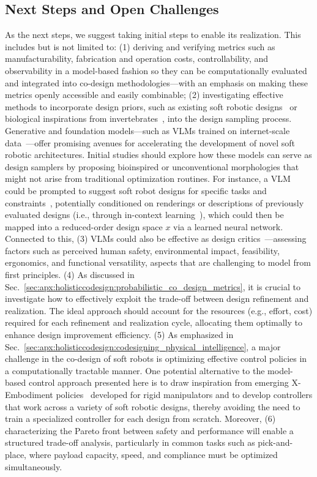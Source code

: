 \subsection{Next Steps and Open Challenges}
As the next steps, we suggest taking initial steps to enable its realization. This includes but is not limited to: (1) deriving and verifying metrics such as manufacturability, fabrication and operation costs, controllability, and observability in a model-based fashion so they can be computationally evaluated and integrated into co-design methodologies—with an emphasis on making these metrics openly accessible and easily combinable; (2) investigating effective methods to incorporate design priors, such as existing soft robotic designs~\citep{navez2024design} or biological inspirations from invertebrates~\citep{laschi2012soft, krieg2015design, chen2020design, laschi2024bioinspiration}, into the design sampling process. Generative and foundation models—such as \glspl{VLM} trained on internet-scale data~\citep{grattafiori2024llama, hurst2024gpt}—offer promising avenues for accelerating the development of novel soft robotic architectures. Initial studies should explore how these models can serve as design samplers by proposing bioinspired or unconventional morphologies that might not arise from traditional optimization routines. For instance, a \gls{VLM} could be prompted to suggest soft robot designs for specific tasks and constraints~\citep{stella2023can, ghasemi2025vision}, potentially conditioned on renderings or descriptions of previously evaluated designs (i.e., through in-context learning~\citep{brown2020language}), which could then be mapped into a reduced-order design space $x$ via a learned neural network. Connected to this, (3) \glspl{VLM} could also be effective as design critics~\citep{ghasemi2025vision}—assessing factors such as perceived human safety, environmental impact, feasibility, ergonomics, and functional versatility, aspects that are challenging to model from first principles. 
(4) As discussed in Sec.~\ref{sec:apx:holisticcodesign:probabilistic_co_design_metrics}, it is crucial to investigate how to effectively exploit the trade-off between design refinement and realization. The ideal approach should account for the resources (e.g., effort, cost) required for each refinement and realization cycle, allocating them optimally to enhance design improvement efficiency.
(5) As emphasized in Sec.~\ref{sec:apx:holisticcodesign:codesigning_physical_intelligence}, a major challenge in the co-design of soft robots is optimizing effective control policies in a computationally tractable manner. One potential alternative to the model-based control approach presented here is to draw inspiration from emerging X-Embodiment policies~\citep{o2024open} developed for rigid manipulators and to develop controllers that work across a variety of soft robotic designs, thereby avoiding the need to train a specialized controller for each design from scratch. Moreover, (6) characterizing the Pareto front between safety and performance will enable a structured trade-off analysis, particularly in common tasks such as pick-and-place, where payload capacity, speed, and compliance must be optimized simultaneously.